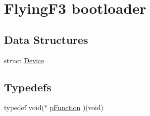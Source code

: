 \hypertarget{group___flying_f3_b_l}{\section{\-Flying\-F3 bootloader}
\label{group___flying_f3_b_l}
}
\subsection*{\-Data \-Structures}
\begin{DoxyCompactItemize}
\item 
struct \hyperlink{struct_device}{\-Device}
\end{DoxyCompactItemize}
\subsection*{\-Typedefs}
\begin{DoxyCompactItemize}
\item 
typedef void($\ast$ \hyperlink{group___flying_f3_b_l_ga9227bf1f1a9c633a0cc9ca50cc761c1a}{p\-Function} )(void)
\end{DoxyCompactItemize}
